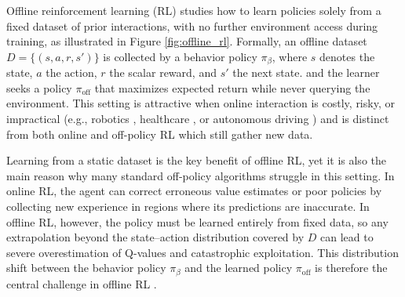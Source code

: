 \documentclass[master,english,final]{kaist-ucs}
\begin{document}

Offline reinforcement learning (RL) studies how to learn policies solely from a fixed dataset of prior interactions, with no further environment access during training, as illustrated in Figure \ref{fig:offline_rl}. Formally, an offline dataset $D=\{(s,a,r,s')\}$ is collected by a behavior policy $\pi_\beta$, where $s$ denotes the state, $a$ the action, $r$ the scalar reward, and $s'$ the next state. and the learner seeks a policy $\pi_{\text{off}}$ that maximizes expected return while never querying the environment. This setting is attractive when online interaction is costly, risky, or impractical (e.g., robotics \cite{singh2022reinforcement}, healthcare \cite{liu2020reinforcement}, or autonomous driving \cite{kiran2021deep}) and is distinct from both online and off-policy RL which still gather new data.

Learning from a static dataset is the key benefit of offline RL, yet it is also the main reason why many standard off-policy algorithms struggle in this setting. In online RL, the agent can correct erroneous value estimates or poor policies by collecting new experience in regions where its predictions are inaccurate. In offline RL, however, the policy must be learned entirely from fixed data, so any extrapolation beyond the state–action distribution covered by $D$ can lead to severe overestimation of Q-values and catastrophic exploitation. This distribution shift between the behavior policy $\pi_\beta$ and the learned policy $\pi_{\text{off}}$ is therefore the central challenge in offline RL \cite{levine2020offline}.
\end{document}
